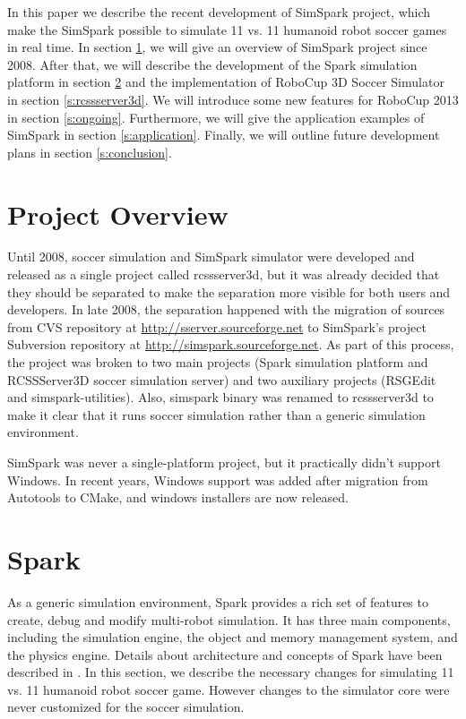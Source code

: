 \documentclass{llncs}
\begin{document}
In this paper we describe the recent development of SimSpark project, which make the SimSpark possible to simulate 11 vs. 11 humanoid robot soccer games in real time.
In section \ref{s:overview}, we will give an overview of SimSpark project since 2008. After that, we will describe the development of the Spark simulation platform in section \ref{s:spark} and the implementation of RoboCup 3D Soccer Simulator in section \ref{s:rcssserver3d}.
We will introduce some new features for RoboCup 2013 in section \ref{s:ongoing}.
Furthermore, we will give the application examples of SimSpark in section \ref{s:application}.
Finally, we will outline future development plans in section \ref{s:conclusion}.

\section{Project Overview}
\label{s:overview}

Until 2008, soccer simulation and SimSpark simulator were developed and released as a single project called rcssserver3d, but it was already decided that they should be separated 
to make the separation more visible for both users and developers.
In late 2008, the separation happened with the migration of sources from CVS repository
at \url{http://sserver.sourceforge.net} to SimSpark's project Subversion repository at 
\url{http://simspark.sourceforge.net}. As part of this process, the project was broken
to two main projects (Spark simulation platform and RCSSServer3D soccer simulation server) 
and two auxiliary projects (RSGEdit and simspark-utilities). Also, simspark binary was 
renamed to rcssserver3d to make it clear that it runs soccer simulation rather than a 
generic simulation environment.

SimSpark was never a single-platform project, but it practically didn't support 
Windows. In recent years, Windows support was added after migration from Autotools
to CMake, and windows installers are now released. 

\section{Spark}
\label{s:spark}
As a generic simulation environment, Spark provides a rich set of features to create, debug and modify multi-robot simulation.
It has three main components, including the simulation engine, the object and memory management system, and the physics engine. Details about architecture and concepts of Spark have been described in \cite{Boedecker2008,OR05}.
In this section, we describe the necessary changes for simulating 11 vs. 11 humanoid robot soccer game.
However changes to the simulator core were never customized for the soccer simulation.
\end{document}
